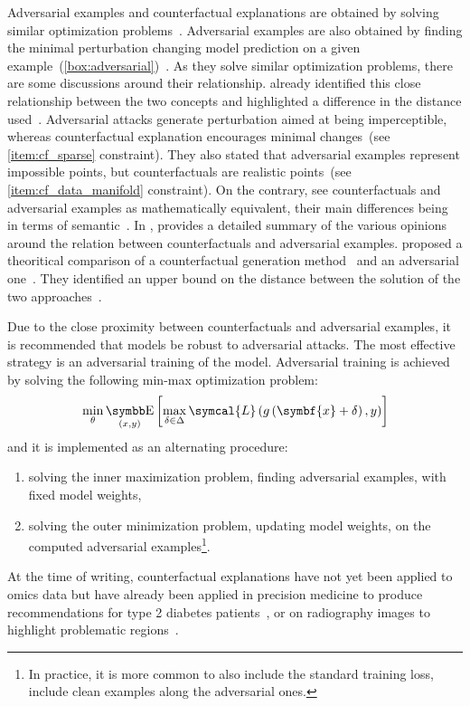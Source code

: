 \documentclass[../main.tex]{subfiles}
\begin{document}
	Adversarial examples and counterfactual explanations are obtained by solving similar optimization problems~\cite{Pawelczyk2021ExploringCE,Freiesleben2021}.
	Adversarial examples are also obtained by finding the minimal perturbation changing model prediction on a given example~(\cref{box:adversarial})~\cite{Szegedy2013IntriguingPO}.
	As they solve similar optimization problems, there are some discussions around their relationship.
	\citeauthor{wachter2017counterfactual} already identified this close relationship between the two concepts and highlighted a difference in the distance used~\cite{wachter2017counterfactual}.
	Adversarial attacks generate perturbation aimed at being imperceptible, whereas counterfactual explanation encourages minimal changes~(see \ref{item:cf_sparse} constraint).
	They also stated that adversarial examples represent impossible points, but counterfactuals are realistic points~(see \ref{item:cf_data_manifold} constraint).
	On the contrary, \citeauthor{browne2020} see counterfactuals and adversarial examples as mathematically equivalent, their main differences being in terms of semantic~\cite{browne2020}.
	In \cite[][8]{Freiesleben2021}, \citeauthor{Freiesleben2021} provides a detailed summary of the various opinions around the relation between counterfactuals and adversarial examples.
	\citeauthor{Pawelczyk2021ExploringCE} proposed a theoritical comparison of a counterfactual generation method~\cite{wachter2017counterfactual} and an adversarial one~\cite{Carlini2016TowardsET}.
	They identified an upper bound on the distance between the solution of the two approaches~\cite{Pawelczyk2021ExploringCE}.

	Due to the close proximity between counterfactuals and adversarial examples, it is recommended that models be robust to adversarial attacks.
	The most effective strategy is an adversarial training of the model.
	Adversarial training is achieved by solving the following min-max optimization problem:
	\begin{equation}
		\min_{\theta} \E_{(x,y)}\left[\max_{\delta \in \Delta} \symcal{L}\left(g\left(\symbf{x}+\delta\right), y \right)  \right]
	\end{equation}
	and it is implemented as an alternating procedure:
	\begin{enumerate}
		\item solving the inner maximization problem, \ie{}finding adversarial examples, with fixed model weights,
		\item solving the outer minimization problem, \ie{}updating model weights, on the computed adversarial examples\footnote{In practice, it is more common to also include the standard training loss, \ie{}include clean examples along the adversarial ones.}.
	\end{enumerate}

	At the time of writing, counterfactual explanations have not yet been applied to omics data but have already been applied in precision medicine to produce recommendations for type 2 diabetes patients~\cite{Lenatti2022}, or on radiography images to highlight problematic regions~\cite{Thiagarajan2022,Mertes2022}.

\end{document}
